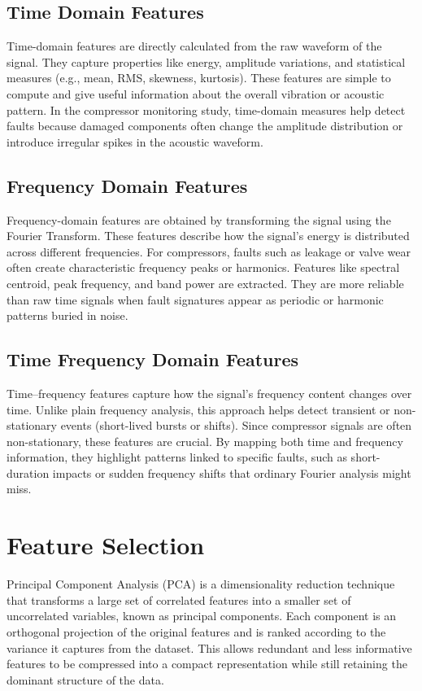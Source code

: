 \documentclass[12pt,a4paper]{article}
\begin{document}
\begin{multicols}{2}
\subsection{Time Domain Features}
Time-domain features are directly calculated from the raw waveform of the signal. They capture properties like energy, amplitude variations, and statistical measures (e.g., mean, RMS, skewness, kurtosis). These features are simple to compute and give useful information about the overall vibration or acoustic pattern. In the compressor monitoring study, time-domain measures help detect faults because damaged components often change the amplitude distribution or introduce irregular spikes in the acoustic waveform.
\subsection{Frequency Domain Features}
Frequency-domain features are obtained by transforming the signal using the Fourier Transform. These features describe how the signal’s energy is distributed across different frequencies. For compressors, faults such as leakage or valve wear often create characteristic frequency peaks or harmonics. Features like spectral centroid, peak frequency, and band power are extracted. They are more reliable than raw time signals when fault signatures appear as periodic or harmonic patterns buried in noise.
\subsection{Time Frequency Domain Features}
Time–frequency features capture how the signal’s frequency content changes over time. Unlike plain frequency analysis, this approach helps detect transient or non-stationary events (short-lived bursts or shifts). Since compressor signals are often non-stationary, these features are crucial. By mapping both time and frequency information, they highlight patterns linked to specific faults, such as short-duration impacts or sudden frequency shifts that ordinary Fourier analysis might miss.
\section{Feature Selection}
\label{sec:features}
Principal Component Analysis (PCA) is a dimensionality reduction technique that
transforms a large set of correlated features into a smaller set of uncorrelated
variables, known as principal components. Each component is an orthogonal
projection of the original features and is ranked according to the variance it
captures from the dataset. This allows redundant and less informative features
to be compressed into a compact representation while still retaining the
dominant structure of the data.


\end{multicols}
\end{document}
